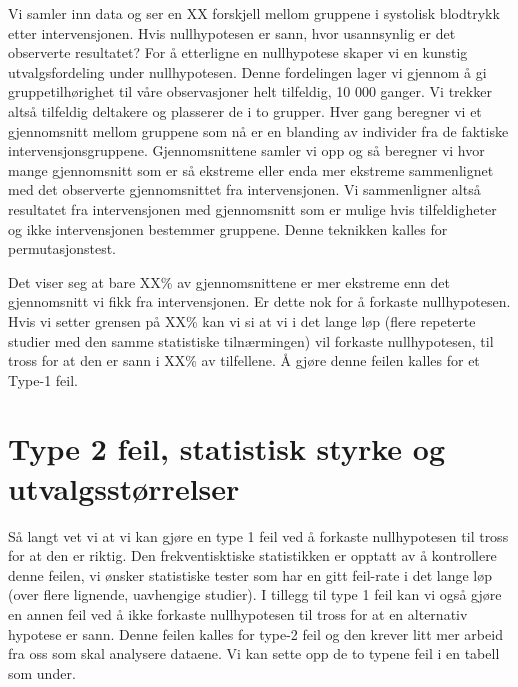 \documentclass[
  letterpaper,
  DIV=11,
  numbers=noendperiod,
  oneside]{scrreprt}
\begin{document}
Vi samler inn data og ser en XX forskjell mellom gruppene i systolisk
blodtrykk etter intervensjonen. Hvis nullhypotesen er sann, hvor
usannsynlig er det observerte resultatet? For å etterligne en
nullhypotese skaper vi en kunstig utvalgsfordeling under nullhypotesen.
Denne fordelingen lager vi gjennom å gi gruppetilhørighet til våre
observasjoner helt tilfeldig, 10 000 ganger. Vi trekker altså tilfeldig
deltakere og plasserer de i to grupper. Hver gang beregner vi et
gjennomsnitt mellom gruppene som nå er en blanding av individer fra de
faktiske intervensjonsgruppene. Gjennomsnittene samler vi opp og så
beregner vi hvor mange gjennomsnitt som er så ekstreme eller enda mer
ekstreme sammenlignet med det observerte gjennomsnittet fra
intervensjonen. Vi sammenligner altså resultatet fra intervensjonen med
gjennomsnitt som er mulige hvis tilfeldigheter og ikke intervensjonen
bestemmer gruppene. Denne teknikken kalles for permutasjonstest.

Det viser seg at bare XX\% av gjennomsnittene er mer ekstreme enn det
gjennomsnitt vi fikk fra intervensjonen. Er dette nok for å forkaste
nullhypotesen. Hvis vi setter grensen på XX\% kan vi si at vi i det
lange løp (flere repeterte studier med den samme statistiske
tilnærmingen) vil forkaste nullhypotesen, til tross for at den er sann i
XX\% av tilfellene. Å gjøre denne feilen kalles for et Type-1 feil.

\hypertarget{type-2-feil-statistisk-styrke-og-utvalgsstuxf8rrelser}{%
\section{Type 2 feil, statistisk styrke og
utvalgsstørrelser}\label{type-2-feil-statistisk-styrke-og-utvalgsstuxf8rrelser}}

Så langt vet vi at vi kan gjøre en type 1 feil ved å forkaste
nullhypotesen til tross for at den er riktig. Den frekventisktiske
statistikken er opptatt av å kontrollere denne feilen, vi ønsker
statistiske tester som har en gitt feil-rate i det lange løp (over flere
lignende, uavhengige studier). I tillegg til type 1 feil kan vi også
gjøre en annen feil ved å ikke forkaste nullhypotesen til tross for at
en alternativ hypotese er sann. Denne feilen kalles for type-2 feil og
den krever litt mer arbeid fra oss som skal analysere dataene. Vi kan
sette opp de to typene feil i en tabell som under.
\end{document}
